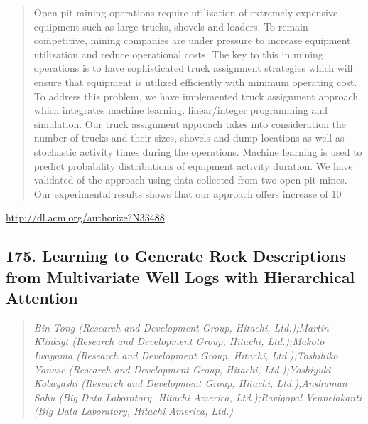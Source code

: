\documentclass{article}
\begin{document}
\begin{quote}
Open pit mining operations require utilization of extremely expensive equipment such as large trucks, shovels and loaders. To remain competitive, mining companies are under pressure to increase equipment utilization and reduce operational costs. The key to this in mining operations is to have sophisticated truck assignment strategies which will ensure that equipment is utilized efficiently with minimum operating cost. To address this problem, we have implemented truck assignment approach which integrates machine learning, linear/integer programming and simulation. Our truck assignment approach takes into consideration the number of trucks and their sizes, shovels and dump locations as well as stochastic activity times during the operations. Machine learning is used to predict probability distributions of equipment activity duration. We have validated of the approach using data collected from two open pit mines. Our experimental results shows that our approach offers increase of 10%
\end{quote}

\href{http://dl.acm.org/authorize?N33488}{http://dl.acm.org/authorize?N33488}

\subsection{175. Learning to Generate Rock Descriptions from Multivariate Well Logs with Hierarchical Attention}

\begin{quote}
\footnotesize{\textit{Bin Tong (Research and Development Group, Hitachi, Ltd.);Martin Klinkigt (Research and Development Group, Hitachi, Ltd.);Makoto Iwayama (Research and Development Group, Hitachi, Ltd.);Toshihiko Yanase (Research and Development Group, Hitachi, Ltd.);Yoshiyuki Kobayashi (Research and Development Group, Hitachi, Ltd.);Anshuman Sahu (Big Data Laboratory, Hitachi America, Ltd.);Ravigopal Vennelakanti (Big Data Laboratory, Hitachi America, Ltd.)}}

\end{quote}
\end{document}
